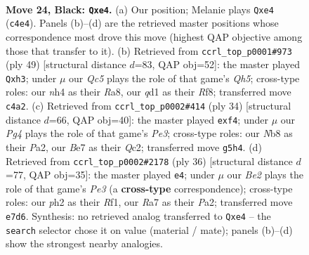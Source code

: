 \documentclass[11pt]{article}
\begin{document}
\clearpage

\begin{figure}[p]\centering
\begin{subfigure}{0.46\textwidth}\centering
\resizebox{\linewidth}{!}{%
\newchessgame
\chessboard[
  setfen={1nr5/rp1Nbpk1/p3p3/B5p1/2q1B2N/4P3/PP3PPP/R2QR1K1 b - - 0 24},
  showmover=false,
  pgfstyle=straightmove, color=movearrow, markmove={c4-e4}
]}
\caption{}
\end{subfigure}\hfill
\begin{subfigure}{0.46\textwidth}\centering
\resizebox{\linewidth}{!}{%
\newchessgame
\chessboard[
  setfen={r4r1k/p5p1/B1Qn3p/3Nbp2/3Pp2q/2P4P/PP3P2/R1B2RK1 b - - 0 25},
  showmover=false,
  pgfstyle=straightmove, color=movearrow, markmove={h4-h3}
]}
\caption{}
\end{subfigure}
\\[4pt]
\begin{subfigure}{0.46\textwidth}\centering
\resizebox{\linewidth}{!}{%
\newchessgame
\chessboard[
  setfen={r3r1k1/pp2qppp/n1p5/8/2b2n2/2P1PNP1/P1QR1PBP/R5K1 w - - 0 18},
  showmover=false,
  pgfstyle=straightmove, color=movearrow, markmove={e3-f4}
]}
\caption{}
\end{subfigure}\hfill
\begin{subfigure}{0.46\textwidth}\centering
\resizebox{\linewidth}{!}{%
\newchessgame
\chessboard[
  setfen={r3qrk1/p4ppp/8/3pNb2/5B2/2PQPPn1/P5PP/R4RK1 w - - 1 19},
  showmover=false,
  pgfstyle=straightmove, color=movearrow, markmove={e3-e4}
]}
\caption{}
\end{subfigure}
\caption{\textbf{Move 24, Black: \texttt{Qxe4}.} (a) Our position; Melanie plays \texttt{Qxe4} (\texttt{c4e4}). Panels (b)--(d) are the retrieved master positions whose correspondence most drove this move (highest QAP objective among those that transfer to it). (b) Retrieved from \texttt{ccrl\_top\_p0001\#973} (ply 49) [structural distance $d$=83, QAP obj=52]: the master played \texttt{Qxh3}; under $\mu$ our \emph{Qc5} plays the role of that game's \emph{Qh5}; cross-type roles: our \emph{n}h4 as their \emph{R}a8, our \emph{q}d1 as their \emph{R}f8; transferred move \texttt{c4a2}. (c) Retrieved from \texttt{ccrl\_top\_p0002\#414} (ply 34) [structural distance $d$=66, QAP obj=40]: the master played \texttt{exf4}; under $\mu$ our \emph{Pg4} plays the role of that game's \emph{Pe3}; cross-type roles: our \emph{N}b8 as their \emph{P}a2, our \emph{B}e7 as their \emph{Q}c2; transferred move \texttt{g5h4}. (d) Retrieved from \texttt{ccrl\_top\_p0002\#2178} (ply 36) [structural distance $d$=77, QAP obj=35]: the master played \texttt{e4}; under $\mu$ our \emph{Be2} plays the role of that game's \emph{Pe3} (a \textbf{cross-type} correspondence); cross-type roles: our \emph{p}h2 as their \emph{R}f1, our \emph{R}a7 as their \emph{P}a2; transferred move \texttt{e7d6}. Synthesis: no retrieved analog transferred to \texttt{Qxe4} -- the \texttt{search} selector chose it on value (material / mate); panels (b)--(d) show the strongest nearby analogies.}
\label{fig:thought-m47}
\end{figure}
\end{document}
